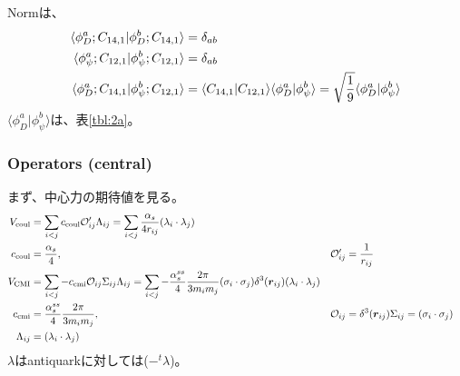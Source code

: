 \documentclass[a4j]{jarticle}
\def\bra{\langle}
\def\ket{\rangle}
\def\lamilamj{{\lambda_i\cdot\lambda_j}}
\def\sigisigj{{\sigma_i\cdot\sigma_j}}
\def\calO{{\cal O}}
\newcommand{\xbld}[1]{\mbox{\boldmath $#1$}}
\def\vecr{{\xbld{r}}}
\def\Vcoul{V_\text{coul}}
\def\Vcmi{V_\text{CMI}}
\begin{document}
Normは、
\begin{align}
\bra \phi_D^a;C_{14,1}|\phi_D^b;C_{14,1}\ket&=\delta_{ab}
\\
\bra \phi_\psi^a;C_{12,1}|\phi_\psi^b;C_{12,1}\ket&=\delta_{ab}
\\
\bra \phi_D^a;C_{14,1}|\phi_\psi^b;C_{12,1}\ket&=\bra C_{14,1}|C_{12,1}\ket\bra \phi_D^a|\phi_\psi^b\ket
=\sqrt{1\over 9}\bra \phi_D^a|\phi_\psi^b\ket
\end{align}
$\bra\phi_D^a|\phi_\psi^b\ket$は、表\ref{tbl:2a}。


\subsubsection{Operators (central)}
まず、中心力の期待値を見る。
\begin{align}
\Vcoul&=\sum_{i<j}c_\text{coul}\calO'_{ij}\Lambda_{ij}=\sum_{i<j}{\alpha_s\over 4 r_{ij}}  (\lamilamj)
\\
c_\text{coul}&={\alpha_s\over 4},&\calO'_{ij}&={1\over r_{ij}}
\\
\Vcmi&= \sum_{i<j}-c_\text{cmi}\calO_{ij}\Sigma_{ij}\Lambda_{ij}
=\sum_{i<j}-{\alpha_s^{ss}\over 4}{2\pi \over 3 m_im_j}(\sigisigj)\delta^3(\vecr_{ij})(\lamilamj)
\\
c_\text{cmi}&={\alpha_s^{ss}\over 4}{2\pi \over 3 m_im_j},&\calO_{ij}&=\delta^3(\vecr_{ij})
\Sigma_{ij}=(\sigisigj)
\\
\Lambda_{ij}&=(\lamilamj)
\end{align}
$\lambda$はantiquarkに対しては($-^t\lambda$)。
\end{document}
